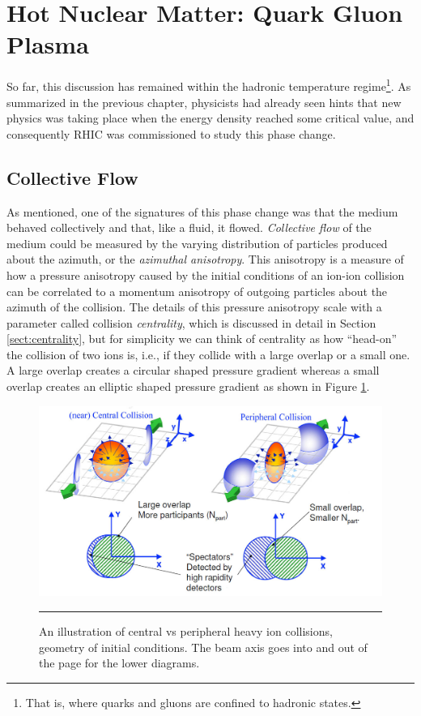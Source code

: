 \section{Hot Nuclear Matter: Quark Gluon Plasma }
So far, this discussion has remained within the hadronic temperature regime\footnote{That is, where quarks and gluons are confined to hadronic states.}. As summarized in the previous chapter, physicists had already seen hints that new physics was taking place when the energy density reached some critical value, and consequently RHIC was commissioned to study this phase change.

\subsection{Collective Flow}
As mentioned, one of the signatures of this phase change was that the medium behaved collectively and that, like a fluid, it flowed. \textit{Collective flow} of the medium could be measured by the varying distribution of particles produced about the azimuth, or the \textit{azimuthal anisotropy}. This anisotropy is a measure of how a pressure anisotropy caused by the initial conditions of an ion-ion collision can be correlated to a momentum anisotropy of outgoing particles about the azimuth of the collision. The details of this pressure anisotropy scale with a parameter called collision \textit{centrality}, which is discussed in detail in Section \ref{sect:centrality}, but for simplicity we can think of centrality as how ``head-on'' the collision of two ions is, i.e., if they collide with a large overlap or a small one. A large overlap creates a circular shaped pressure gradient whereas a small overlap creates an elliptic shaped pressure gradient as shown in Figure \ref{fig:centvsperiph1}.

\begin{figure}[htbp]
\centering
    \includegraphics[width=1\textwidth]{Figures/centralvsperipheral.jpg}    
\rule{35em}{0.5pt}
	\caption[Central vs Peripheral collisions, geometry of initial conditions]{An illustration of central vs peripheral heavy ion collisions, geometry of initial conditions. The beam axis goes into and out of the page for the lower diagrams.}
\label{fig:centvsperiph1}
\end{figure}

